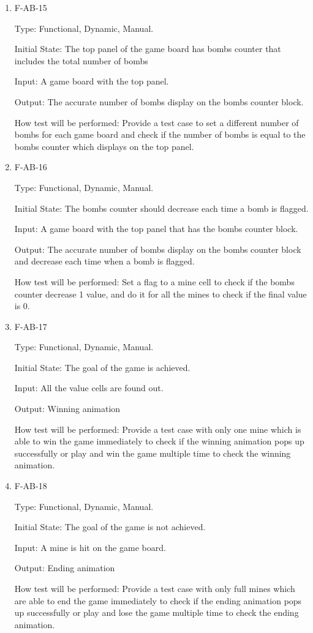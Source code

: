 \documentclass[12pt, titlepage]{article}
\begin{document}
\begin{enumerate}
\item{F-AB-15\\}

Type: Functional, Dynamic, Manual.
					
Initial State: The top panel of the game board has bombs counter that includes the total number of bombs
					
Input: A game board with the top panel.
					
Output: The accurate number of bombs display on the bombs counter block.
					
How test will be performed: Provide a test case to set a different number of bombs for each game board and check if the number of bombs is equal to the bombs counter which displays on the top panel.

\item{F-AB-16\\}

Type: Functional, Dynamic, Manual.
					
Initial State: The bombs counter should decrease each time a bomb is flagged.
					
Input: A game board with the top panel that has the bombs counter block.
					
Output: The accurate number of bombs display on the bombs counter block and decrease each time when a bomb is flagged.
					
How test will be performed: Set a flag to a mine cell to check if the bombs counter decrease 1 value, and do it for all the mines to check if the final value is 0.

\item{F-AB-17\\}

Type: Functional, Dynamic, Manual.
					
Initial State: The goal of the game is achieved.
					
Input: All the value cells are found out.
					
Output: Winning animation
					
How test will be performed: Provide a test case with only one mine which is able to win the game immediately to check if the winning animation pops up successfully or play and win the game multiple time to check the winning animation.

\item{F-AB-18\\}

Type: Functional, Dynamic, Manual.
					
Initial State: The goal of the game is not achieved.
					
Input: A mine is hit on the game board.
					
Output: Ending animation
					
How test will be performed: Provide a test case with only full mines which are able to end the game immediately to check if the ending animation pops up successfully or play and lose the game multiple time to check the ending animation.

\end{enumerate}
\end{document}
